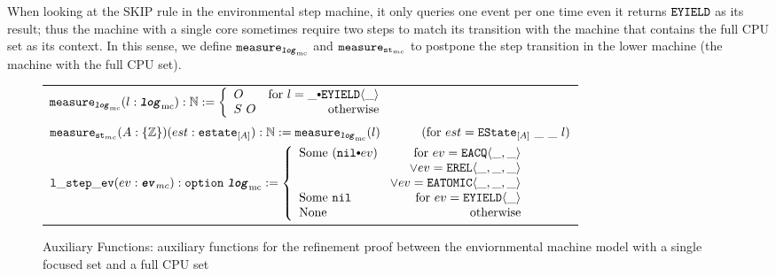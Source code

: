 When looking at the \textsf{SKIP} rule in the environmental step machine, 
it only queries one event per one time even it returns ${{\mathrm{\texttt{EYIELD}}}}$ as its result;
thus the machine with a single core sometimes require two steps to match its transition with the machine that contains the full CPU set as its context. 
In this sense, we define ${{\mathrm{\texttt{measure}}}_{{{\mathrm{\texttt{\textbf{\textit{log}}}}}_{\mathrm{mc}}}}}$ and ${{\mathrm{\texttt{measure}}}_{{\mathrm{\texttt{st}}}_{mc}}}$ to postpone the step transition in the lower machine (the machine with the full CPU set). 

\begin{figure}
\noindent{}
\begin{center}
\begin{tabular}{l}
$
   \mcmeasurekwd (l : \mclog)  : \nattype :=
     \left\{\begin{array}{lr}
        O & \text{for }  l = \listconsoppo{\yieldev{\_}}{\_} \\
        S \ O & \text{otherwise}\\
        \end{array} \right.$ \\
$ \mcstatemeasurekwd (A : \set{\ztype}) (est : \envstatekwd_{[A]}) : \nattype := \mcmeasurenoeq{l} \ \ \ \ \ \ \ \ \ \ (\text{for } est = \envstate{A}{\_}{\_}{l}) $\\
$ \localstepevkwd (ev : \mcevent) : \optiondef\ \mclog := 
     \left\{\begin{array}{lr}
        \mathrm{Some} \ (\listconsoppo{ev}{\nulllist}) & \text{for }  ev = \acqev{\_}{\_} \\
                                        & \vee  ev= \relev{\_}{\_}{\_} \\
                                        & \vee ev= \atomicev{\_}{\_}{\_} \\
        \mathrm{Some} \ \nulllist & \text{for }  ev = \yieldev{\_} \\
	   \mathrm{None} & \text{otherwise}\\
        \end{array} \right. $ \\
\end{tabular}        
\end{center}
%  
%
\caption{Auxiliary Functions:  auxiliary functions for the refinement proof between
the enviornmental machine model with a single focused set and a full CPU set}
\label{fig:chapter:conlink:auxiliary-function-for-full-cpus-and-a-single-cpu}
\end{figure}


